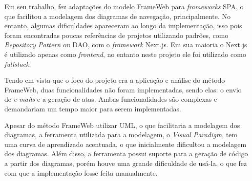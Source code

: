 

Em seu trabalho,  fez adaptações do modelo FrameWeb para \textit{frameworks} SPA, o que facilitou 
a modelagem dos diagramas de navegação, principalmente. No entanto, algumas dificuldades apareceram ao longo da implementação,
isso pois foram encontradas poucas referências de projetos utilizando padrões, como \textit{Repository Pattern} ou DAO, com o \textit{framework} Next.js.
Em sua maioria o Next.js é utilizado apenas como \textit{frontend}, no entanto neste projeto ele foi utilizado como \textit{fullstack}.


Tendo em vista que o foco do projeto era a aplicação e análise do método FrameWeb, duas funcionalidades não foram implementadas,
sendo elas: o envio de \textit{e-mails} e a geração de atas. Ambas funcionalidades são complexas e demandariam um tempo maior para serem implementadas.




Apesar do método FrameWeb utilizar UML, o que facilitaria a modelagem dos diagramas, a ferramenta utilizada para a modelagem, o \textit{Visual Paradigm}, 
tem uma curva de aprendizado acentuada, o que inicialmente dificultou a modelagem dos diagramas. Além disso, a ferramenta possui suporte para a geração de código
a partir dos diagramas, porém houve uma grande dificuldade de usá-la, o que fez com que a implementação fosse feita manualmente.

